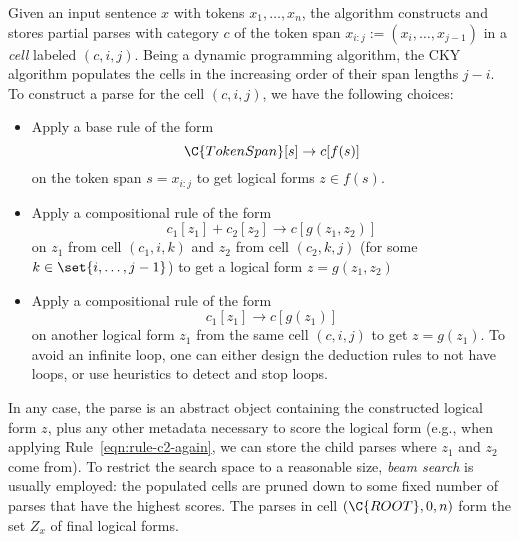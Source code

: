 Given an input sentence $x$ with tokens $x_1, \dots, x_n$,
the algorithm constructs and stores partial parses
with category $c$
of the token span $x_{i:j} := (x_i, \dots, x_{j-1})$
in a \emph{cell} labeled $(c, i, j)$.
Being a dynamic programming algorithm,
the CKY algorithm populates the cells in the increasing order
of their span lengths $j - i$.
To construct a parse for the cell $(c, i, j)$,
we have the following choices:
\begin{itemize}
\item Apply a base rule of the form
\begin{equation*}
\C{TokenSpan}[s] \to c[f(s)]
\end{equation*}
on the token span $s = x_{i:j}$ to get logical forms $z \in f(s)$.
\item Apply a compositional rule of the form
\begin{equation*}
c_1[z_1] + c_2[z_2] \to c[g(z_1, z_2)]
\label{eqn:rule-c2-again}
\end{equation*}
on $z_1$ from cell $(c_1, i, k)$ and
$z_2$ from cell $(c_2, k, j)$ (for some $k \in \set{i,\dots,j-1}$)
to get a logical form $z = g(z_1, z_2)$
\item Apply a compositional rule of the form
\begin{equation*}
c_1[z_1] \to c[g(z_1)]
\end{equation*}
on another logical form $z_1$ from the same cell $(c, i, j)$
to get $z = g(z_1)$.
To avoid an infinite loop,
one can either design the deduction rules
to not have loops,
or use heuristics to detect and stop loops.
\end{itemize}

In any case, the parse is an abstract object containing
the constructed logical form $z$, plus any other metadata necessary
to score the logical form (e.g., when applying
Rule~\ref{eqn:rule-c2-again}, we can store the child parses
where $z_1$ and $z_2$ come from).
To restrict the search space to a reasonable size,
\emph{beam search} is usually employed:
the populated cells are pruned down to some
fixed number of parses that have the highest scores.
The parses in cell $(\C{ROOT}, 0, n)$
form the set $Z_x$ of final logical forms.

